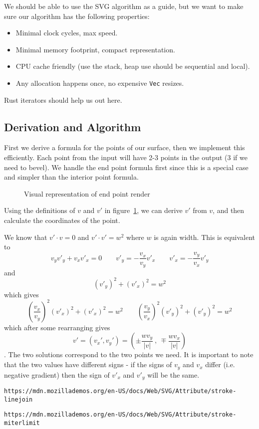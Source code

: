 \documentclass[]{article}
\begin{document}
We should be able to use the SVG algorithm as a guide, but we want to make sure our algorithm has the following properties:
\begin{itemize}
	\item Minimal clock cycles, max speed.
	\item Minimal memory footprint, compact representation.
	\item CPU cache friendly (use the stack, heap use should be sequential and local).
	\item Any allocation happens once, no expensive \texttt{Vec} resizes.
\end{itemize}
Rust iterators should help us out here.

\subsection{Derivation and Algorithm}
First we derive a formula for the points of our surface, then we implement this efficiently. Each point from the input will have 2-3 points in the output (3 if we need to bevel). We handle the end point formula first since this is a special case and simpler than the interior point formula.

\begin{figure}[!htbp]
	\centering
	\def\svgwidth{200pt}
	
	\caption{Visual representation of end point render}
	\label{fig:linegraph-exterior}
\end{figure}

Using the definitions of $v$ and $v'$ in figure~\ref{fig:linegraph-exterior}, we can derive $v'$ from $v$, and then calculate the coordinates of the point.

We know that $v' \cdot v = 0$ and $v' \cdot v' = w^2$ where $w$ is again width. This is equivalent to 
\[v_y v'_y + v_x v'_x = 0 \qquad v'_y = -\frac{v_x}{v_y} v'_x  \qquad v'_x = -\frac{v_y}{v_x} v'_y\]
and \[(v'_y)^2 + (v'_x)^2 = w^2\] which gives 
\[\left(\frac{v_x}{v_y}\right)^2 (v'_x)^2 + (v'_x)^2 = w^2 \qquad
\left(\frac{v_y}{v_x}\right)^2 (v'_y)^2 + (v'_y)^2 = w^2
\] which after some rearranging gives 
\[v' = (v_x', v_y') = \left( \pm \frac{w v_y}{|v|}\ ,\  \mp \frac{w v_x}{|v|}\right)\]. The two solutions correspond to the two points we need. It is important to note that the two values have different signs - if the signs of $v_y$ and $v_x$ differ (i.e. negative gradient) then the sign of $v'_x$ and $v'_y$ will be the same.

\begin{thebibliography}{9}
	\texttt{https://mdn.mozillademos.org/en-US/docs/Web/SVG/Attribute/stroke-linejoin}
	
	\texttt{https://mdn.mozillademos.org/en-US/docs/Web/SVG/Attribute/stroke-miterlimit}
\end{thebibliography}
\end{document}
